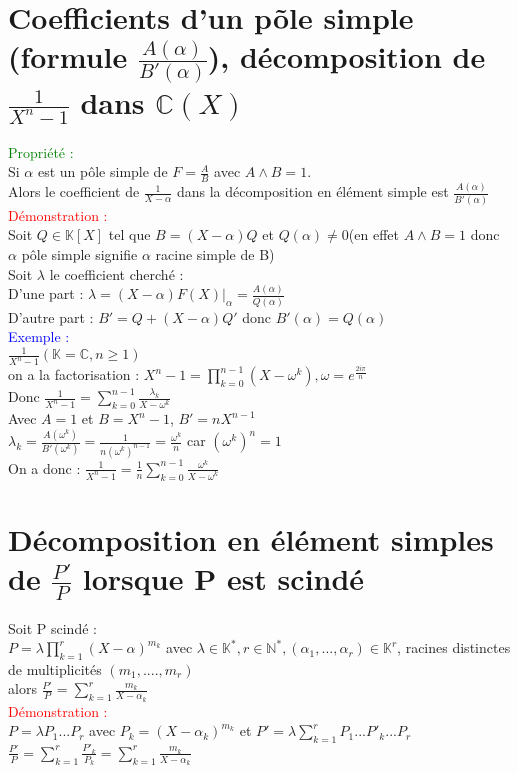\documentclass{article}
\begin{document}
\section{Coefficients d'un põle simple (formule $\frac{A(\alpha)}{B'(\alpha)}$), décomposition de $\frac{1}{X^n-1}$ dans $\mathbb{C}(X)$}
\textcolor{green}{Propriété :} \\
Si $\alpha$ est un pôle simple de $F= \frac{A}{B}$ avec $A \wedge B=1$. \\
Alors le coefficient de $\frac{1}{X-\alpha}$ dans la décomposition en élément simple est $\frac{A(\alpha)}{B'(\alpha)}$ \\
\textcolor{red}{Démonstration :} \\
Soit $Q \in \mathbb K [X]$ tel que $B=(X-\alpha)Q$ et $Q(\alpha) \neq 0$(en effet $A \wedge B =1$ donc $\alpha$ pôle simple signifie $\alpha$ racine simple de B) \\
Soit $ \lambda$ le coefficient cherché : \\
D'une part : $\lambda=(X-\alpha)F(X)|_{\alpha}= \frac{A(\alpha)}{Q(\alpha)}$  \\
D'autre part : $B'=Q+(X-\alpha)Q'$ donc $B'(\alpha)=Q(\alpha)$ \\
\textcolor{blue}{Exemple :} \\
$\frac{1}{X^n-1}(\mathbb K = \mathbb C, n \geq 1)$ \\
on a la factorisation : $X^n-1=\prod_{k=0}^{n-1}(X-\omega^k), \omega=e^{\frac{2i\pi}{n}}$ \\
Donc $\frac{1}{X^n-1}= \sum_{k=0}^{n-1} \frac{\lambda_k}{X-\omega^k}$ \\
Avec $A=1$ et $B=X^n-1$, $B'=nX^{n-1}$ \\
$\lambda_k=\frac{A(\omega^k)}{B'(\omega^k)}=\frac{1}{n(\omega^k)^{n-1}}=\frac{\omega^k}{n}$ car $(\omega^k)^n=1$ \\
On a donc : $\frac{1}{X^n-1}=\frac{1}{n}\sum^{n-1}_{k=0}\frac{\omega^k}{X-\omega^k}$
\section{Décomposition en élément simples de $\frac{P'}{P}$ lorsque P est scindé}
Soit P scindé :  \\
$P= \lambda \prod_{k=1}^r (X-\alpha)^{m_k}$ avec $\lambda \in \mathbb K^*,r \in \mathbb N^*,(\alpha_1,...,\alpha_r) \in \mathbb K^r$, racines distinctes de multiplicités $(m_1,....,m_r)$\\
 alors  $\frac{P'}{P}=\sum_{k=1}^r \frac{m_k}{X-\alpha_k}$ \\
\textcolor{red}{Démonstration :} \\
$P=\lambda P_1 ... P_r$ avec $P_k=(X-\alpha_k)^{m_k}$ et $P'=\lambda \sum_{k=1}^rP_1...P'_k...P_r$ \\
$\frac{P'}{P}=\sum_{k=1}^r \frac{P'_k}{P_k}=\sum^r_{k=1} \frac{m_k}{X-\alpha_k}$
\end{document}
